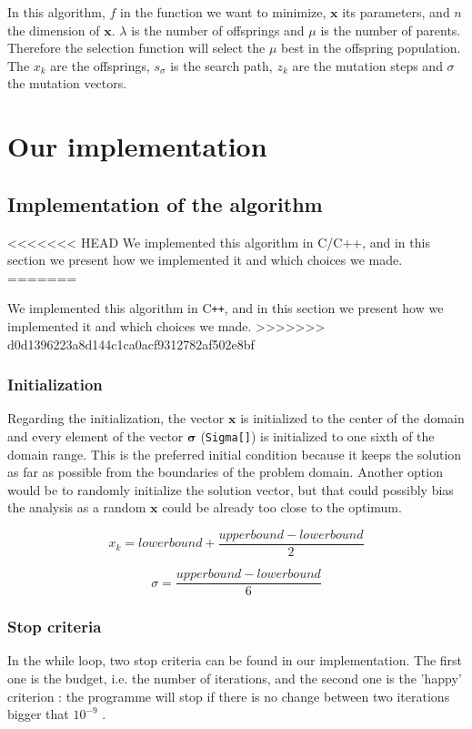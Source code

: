 \documentclass[transmag]{IEEEtran}
\def\CPP{C\texttt{++}}
\begin{document}
In this algorithm, $f$ in the function we want to minimize, $\bm{x}$ its parameters, and $n$ the dimension of $\bm{x}$. $\lambda$ is the number of offsprings and $\mu$ is the number of parents. Therefore the selection function will select the $\mu$ best in the offspring population. The $x_k$ are the offsprings, $s_{\sigma}$ is the search path, $z_k$ are the mutation steps and $\sigma$ the mutation vectors. 

\section{Our implementation}

\subsection{Implementation of the algorithm}
<<<<<<< HEAD
We implemented this algorithm in C/C++, and in this section we present how we implemented it and which choices we made. 
=======

We implemented this algorithm in \CPP, and in this section we present how we implemented it and which choices we made. 
>>>>>>> d0d1396223a8d144c1ca0acf9312782af502e8bf

\subsubsection{Initialization}

Regarding the initialization, the vector $\bm{x}$ is initialized to the center of the domain and every element of the vector $\bm{\sigma}$ (\verb|Sigma[]|) is initialized to one sixth of the domain range. This is the preferred initial condition because it keeps the solution as far as possible from the boundaries of the problem domain. Another option would be to randomly initialize the solution vector, but that could possibly bias the analysis as a random $\bm{x}$ could be already too close to the optimum.

$$x_k = lower bound + \frac{upper bound - lower bound}{2} $$

$$\sigma = \frac{upper bound - lower bound}{6}$$

\subsubsection{Stop criteria}
In the while loop, two stop criteria can be found in our implementation. The first one is the budget, i.e. the number of iterations, and the second one is the 'happy' criterion : the programme will stop if there is no change between two iterations bigger that $10^{-9}$ .
\end{document}
